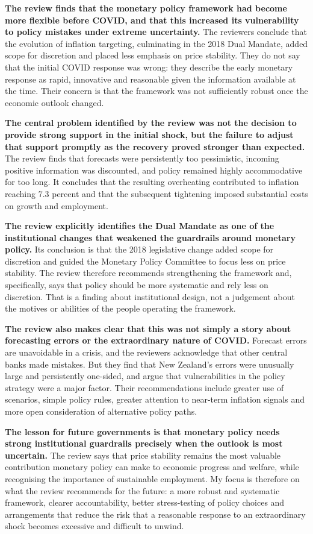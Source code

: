 \documentclass[11pt,notitlepage]{article}
\begin{document}
\textbf{The review finds that the monetary policy framework had become more flexible before COVID, and that this increased its vulnerability to policy mistakes under extreme uncertainty.} The reviewers conclude that the evolution of inflation targeting, culminating in the 2018 Dual Mandate, added scope for discretion and placed less emphasis on price stability. They do not say that the initial COVID response was wrong: they describe the early monetary response as rapid, innovative and reasonable given the information available at the time. Their concern is that the framework was not sufficiently robust once the economic outlook changed.

\textbf{The central problem identified by the review was not the decision to provide strong support in the initial shock, but the failure to adjust that support promptly as the recovery proved stronger than expected.} The review finds that forecasts were persistently too pessimistic, incoming positive information was discounted, and policy remained highly accommodative for too long. It concludes that the resulting overheating contributed to inflation reaching 7.3 percent and that the subsequent tightening imposed substantial costs on growth and employment.

\textbf{The review explicitly identifies the Dual Mandate as one of the institutional changes that weakened the guardrails around monetary policy.} Its conclusion is that the 2018 legislative change added scope for discretion and guided the Monetary Policy Committee to focus less on price stability. The review therefore recommends strengthening the framework and, specifically, says that policy should be more systematic and rely less on discretion. That is a finding about institutional design, not a judgement about the motives or abilities of the people operating the framework.

\textbf{The review also makes clear that this was not simply a story about forecasting errors or the extraordinary nature of COVID.} Forecast errors are unavoidable in a crisis, and the reviewers acknowledge that other central banks made mistakes. But they find that New Zealand's errors were unusually large and persistently one-sided, and argue that vulnerabilities in the policy strategy were a major factor. Their recommendations include greater use of scenarios, simple policy rules, greater attention to near-term inflation signals and more open consideration of alternative policy paths.

\textbf{The lesson for future governments is that monetary policy needs strong institutional guardrails precisely when the outlook is most uncertain.} The review says that price stability remains the most valuable contribution monetary policy can make to economic progress and welfare, while recognising the importance of sustainable employment. My focus is therefore on what the review recommends for the future: a more robust and systematic framework, clearer accountability, better stress-testing of policy choices and arrangements that reduce the risk that a reasonable response to an extraordinary shock becomes excessive and difficult to unwind.
\end{document}
